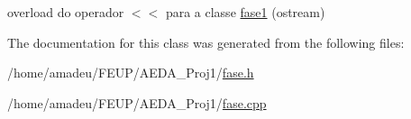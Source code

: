 overload do operador $<$$<$ para a classe \hyperlink{classfase1}{fase1} (ostream) 



The documentation for this class was generated from the following files\+:\begin{DoxyCompactItemize}
\item 
/home/amadeu/\+F\+E\+U\+P/\+A\+E\+D\+A\+\_\+\+Proj1/\hyperlink{fase_8h}{fase.\+h}\item 
/home/amadeu/\+F\+E\+U\+P/\+A\+E\+D\+A\+\_\+\+Proj1/\hyperlink{fase_8cpp}{fase.\+cpp}\end{DoxyCompactItemize}
